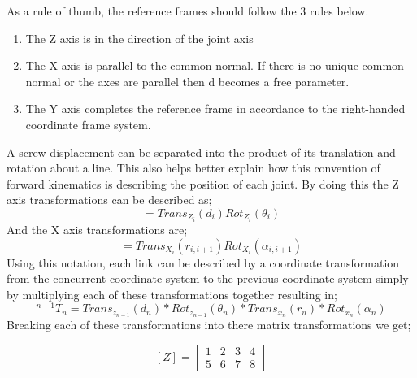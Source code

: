             As a rule of thumb, the reference frames should follow the 3 rules below.
            \begin{enumerate}
                \item The Z axis is in the direction of the joint axis
                \item The X axis is parallel to the common normal. If there is no unique common normal or the axes are parallel then d becomes a free parameter.
                \item The Y axis completes the reference frame in accordance to the right-handed coordinate frame system.
            \end{enumerate}
            
            A screw displacement can be separated into the product of its translation and rotation about a line. This also helps better explain how this convention of forward kinematics is describing the position of each joint. By doing this the Z axis transformations can be described as;
            \begin{equation}
            [Z_i] = Trans_{Z_i}(d_i)Rot_{Z_i}(\theta_i)
            \end{equation}
            And the X axis transformations are;
            \begin{equation}
            [X_i] = Trans_{X_i}(r_{i,i+1})Rot_{X_i}(\alpha_{i,i+1})
            \end{equation}
            Using this notation, each link can be described by a coordinate transformation from the concurrent coordinate system to the previous coordinate system simply by multiplying each of these transformations together resulting in;
            \begin{equation}
            ^{n-1}T_n=Trans_{z_{n-1}}(d_n)*Rot_{z_{n-1}}(\theta_n)*Trans_{x_n}(r_n)*Rot_{x_n}(\alpha_n)
            \end{equation}
            Breaking each of these transformations into there matrix transformations we get;
            \begin{figure}[H]
                $$
                [Z] = \begin{bmatrix}
                    1 & 2 & 3 & 4 \\
                    5 & 6 & 7 & 8
                \end{bmatrix}
                $$
            \end{figure}
            

